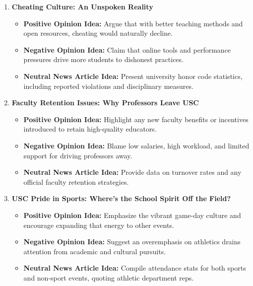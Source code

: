 \documentclass{article}
\begin{document}
\begin{enumerate}
    \item \textbf{Cheating Culture: An Unspoken Reality}
    \begin{itemize}
        \item \textbf{Positive Opinion Idea:} Argue that with better teaching methods and open resources, cheating would naturally decline.
        \item \textbf{Negative Opinion Idea:} Claim that online tools and performance pressures drive more students to dishonest practices.
        \item \textbf{Neutral News Article Idea:} Present university honor code statistics, including reported violations and disciplinary measures.
    \end{itemize}

    \item \textbf{Faculty Retention Issues: Why Professors Leave USC}
    \begin{itemize}
        \item \textbf{Positive Opinion Idea:} Highlight any new faculty benefits or incentives introduced to retain high-quality educators.
        \item \textbf{Negative Opinion Idea:} Blame low salaries, high workload, and limited support for driving professors away.
        \item \textbf{Neutral News Article Idea:} Provide data on turnover rates and any official faculty retention strategies.
    \end{itemize}

    \item \textbf{USC Pride in Sports: Where’s the School Spirit Off the Field?}
    \begin{itemize}
        \item \textbf{Positive Opinion Idea:} Emphasize the vibrant game-day culture and encourage expanding that energy to other events.
        \item \textbf{Negative Opinion Idea:} Suggest an overemphasis on athletics drains attention from academic and cultural pursuits.
        \item \textbf{Neutral News Article Idea:} Compile attendance stats for both sports and non-sport events, quoting athletic department reps.
    \end{itemize}
\end{enumerate}
\end{document}
